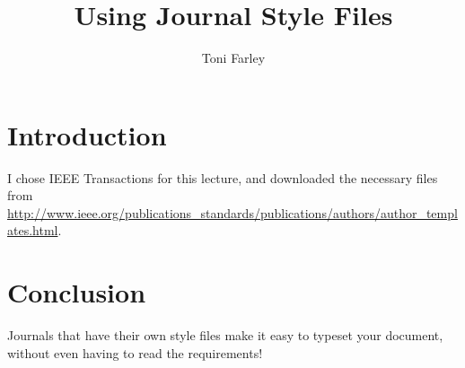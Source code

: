 \documentclass[conference]{IEEEtran}
\title{Using Journal Style Files}
\author{Toni Farley}
\date{}
\begin{document}
\maketitle

\section{Introduction}

I chose IEEE Transactions for this lecture, and downloaded the necessary files from \url{http://www.ieee.org/publications_standards/publications/authors/author_templates.html}. 

\section{Conclusion}

Journals that have their own style files make it easy to typeset your document, without even having to read the requirements!
\end{document}
